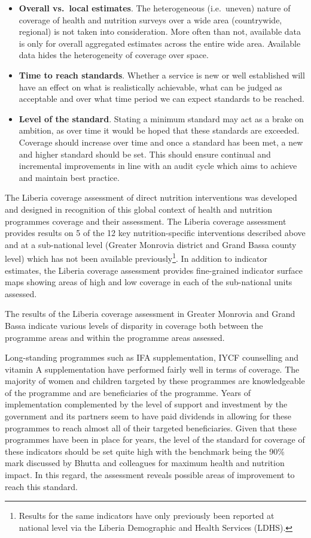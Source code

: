 \documentclass[12pt,a4paper]{article}
\let\rmarkdownfootnote\footnote%
\def\footnote{\protect\rmarkdownfootnote}
\begin{document}
\begin{itemize}
\item
  \textbf{Overall vs.~local estimates}. The heterogeneous (i.e.~uneven) nature of coverage of health and nutrition surveys over a wide area (countrywide, regional) is not taken into consideration. More often than not, available data is only for overall aggregated estimates across the entire wide area. Available data hides the heterogeneity of coverage over space.
\item
  \textbf{Time to reach standards}. Whether a service is new or well established will have an effect on what is realistically achievable, what can be judged as acceptable and over what time period we can expect standards to be reached.
\item
  \textbf{Level of the standard}. Stating a minimum standard may act as a brake on ambition, as over time it would be hoped that these standards are exceeded. Coverage should increase over time and once a standard has been met, a new and higher standard should be set. This should ensure continual and incremental improvements in line with an audit cycle which aims to achieve and maintain best practice.
\end{itemize}

The Liberia coverage assessment of direct nutrition interventions was developed and designed in recognition of this global context of health and nutrition programmes coverage and their assessment. The Liberia coverage assessment provides results on 5 of the 12 key nutrition-specific interventions described above and at a sub-national level (Greater Monrovia district and Grand Bassa county level) which has not been available previously\footnote{Results for the same indicators have only previously been reported at national level via the Liberia Demographic and Health Services (LDHS).}. In addition to indicator estimates, the Liberia coverage assessment provides fine-grained indicator surface maps showing areas of high and low coverage in each of the sub-national units assessed.

The results of the Liberia coverage assessment in Greater Monrovia and Grand Bassa indicate various levels of disparity in coverage both between the programme areas and within the programme areas assessed.

Long-standing programmes such as IFA supplementation, IYCF counselling and vitamin A supplementation have performed fairly well in terms of coverage. The majority of women and children targeted by these programmes are knowledgeable of the programme and are beneficiaries of the programme. Years of implementation complemented by the level of support and investment by the government and its partners seem to have paid dividends in allowing for these programmes to reach almost all of their targeted beneficiaries. Given that these programmes have been in place for years, the level of the standard for coverage of these indicators should be set quite high with the benchmark being the 90\% mark discussed by Bhutta and colleagues \citep{Bhutta:2013ks} for maximum health and nutrition impact. In this regard, the assessment reveals possible areas of improvement to reach this standard.
\end{document}
